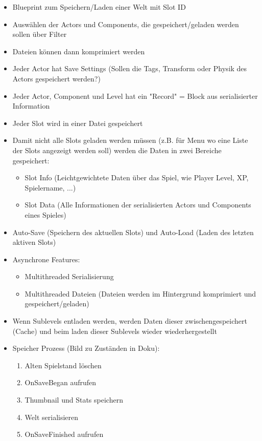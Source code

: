 \begin{itemize}
    \item Blueprint zum Speichern/Laden einer Welt mit Slot ID
    \item Auswählen der Actors und Components, die gespeichert/geladen werden sollen über Filter
    \item Dateien können dann komprimiert werden
    \item Jeder Actor hat Save Settings (Sollen die Tags, Transform oder Physik des Actors gespeichert werden?)
    \item Jeder Actor, Component und Level hat ein "Record" = Block aus serialisierter Information
    \item Jeder Slot wird in einer Datei gespeichert 
    \item Damit nicht alle Slots geladen werden müssen (z.B. für Menu wo eine Liste der Slots angezeigt werden soll) werden die Daten in zwei Bereiche gespeichert:
    \begin{itemize}
        \item Slot Info (Leichtgewichtete Daten über das Spiel, wie Player Level, XP, Spielername, ...)
        \item Slot Data (Alle Informationen der serialisierten Actors und Components eines Spieles)
    \end{itemize}
    \item Auto-Save (Speichern des aktuellen Slots) und Auto-Load (Laden des letzten aktiven Slots)
    \item Asynchrone Features:
    \begin{itemize}
        \item Multithreaded Serialisierung
        \item Multithreaded Dateien (Dateien werden im Hintergrund komprimiert und gespeichert/geladen)
    \end{itemize} 
    \item Wenn Sublevels entladen werden, werden Daten dieser zwischengespeichert (Cache) und beim laden dieser Sublevels wieder wiederhergestellt
    \item Speicher Prozess (Bild zu Zuständen in Doku):
    \begin{enumerate}
        \item Alten Spielstand löschen
        \item OnSaveBegan aufrufen
        \item Thumbnail und Stats speichern
        \item Welt serialisieren
        \item OnSaveFinished aufrufen

\end{enumerate}
\end{itemize}
